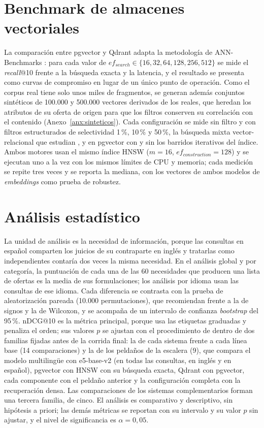 \section{Benchmark de almacenes vectoriales}
\label{sec:met-benchmark}

La comparación entre pgvector y Qdrant adapta la metodología de ANN-Benchmarks \citep{Aumuller2020}: para cada valor de $ef_{search} \in \{16, 32, 64, 128, 256, 512\}$ se mide el \textit{recall}@10 frente a la búsqueda exacta y la latencia, y el resultado se presenta como curvas de compromiso en lugar de un único punto de operación. Como el corpus real tiene solo unos miles de fragmentos, se generan además conjuntos sintéticos de 100.000 y 500.000 vectores derivados de los reales, que heredan los atributos de su oferta de origen para que los filtros conserven su correlación con el contenido (Anexo~\ref{anx:sinteticos}). Cada configuración se mide sin filtro y con filtros estructurados de selectividad 1\,\%, 10\,\% y 50\,\%, la búsqueda mixta vector-relacional que estudian \citet{Sanca2024}, y en pgvector con y sin los barridos iterativos del índice. Ambos motores usan el mismo índice HNSW ($m=16$, $ef_{construction}=128$) y se ejecutan uno a la vez con los mismos límites de CPU y memoria; cada medición se repite tres veces y se reporta la mediana, con los vectores de ambos modelos de \textit{embeddings} como prueba de robustez.

\section{Análisis estadístico}
\label{sec:met-estadistica}

La unidad de análisis es la necesidad de información, porque las consultas en español comparten los juicios de su contraparte en inglés y tratarlas como independientes contaría dos veces la misma necesidad. En el análisis global y por categoría, la puntuación de cada una de las 60 necesidades que producen una lista de ofertas es la media de sus formulaciones; los análisis por idioma usan las consultas de ese idioma. Cada diferencia se contrasta con la prueba de aleatorización pareada (10.000 permutaciones), que \citet{Smucker2007} recomiendan frente a la de signos y la de Wilcoxon, y se acompaña de un intervalo de confianza \textit{bootstrap} del 95\,\%. nDCG@10 es la métrica principal, porque usa las etiquetas graduadas y penaliza el orden; sus valores $p$ se ajustan con el procedimiento de \citet{Holm1979} dentro de dos familias fijadas antes de la corrida final: la de cada sistema frente a cada línea base (14 comparaciones) y la de los peldaños de la escalera (9), que compara el modelo multilingüe con e5-base-v2 (en todas las consultas, en inglés y en español), pgvector con HNSW con su búsqueda exacta, Qdrant con pgvector, cada componente con el peldaño anterior y la configuración completa con la recuperación densa. Las comparaciones de los sistemas complementarios forman una tercera familia, de cinco. El análisis es comparativo y descriptivo, sin hipótesis a priori; las demás métricas se reportan con su intervalo y su valor $p$ sin ajustar, y el nivel de significancia es $\alpha = 0{,}05$.

